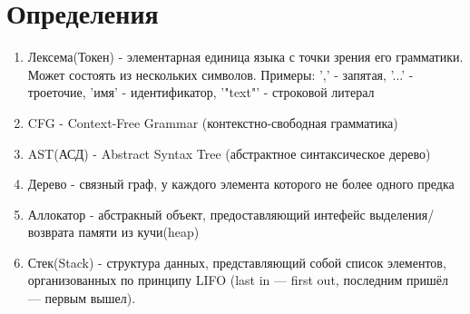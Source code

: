 % 



\newpage
\section{Определения}

\begin{enumerate}
\item Лексема(Токен) - элементарная единица языка с точки зрения его грамматики. Может состоять из нескольких символов.
Примеры: ',' - запятая, '...' - троеточие, 'имя' - идентификатор, '"text"' - строковой литерал

\item CFG - Context-Free Grammar (контекстно-свободная грамматика)

\item AST(АСД) - Abstract Syntax Tree (абстрактное синтаксическое дерево)

\item Дерево - связный граф, у каждого элемента которого не более одного предка

\item Аллокатор - абстракный объект, предоставляющий интефейс выделения/возврата памяти из кучи(heap)

\item Стек(Stack) -  структура данных, представляющий собой список элементов, организованных по принципу LIFO (last in — first out, последним пришёл — первым вышел).
\end{enumerate}

\def\titlecite#1{\citetitle{#1}\cite{#1}}

